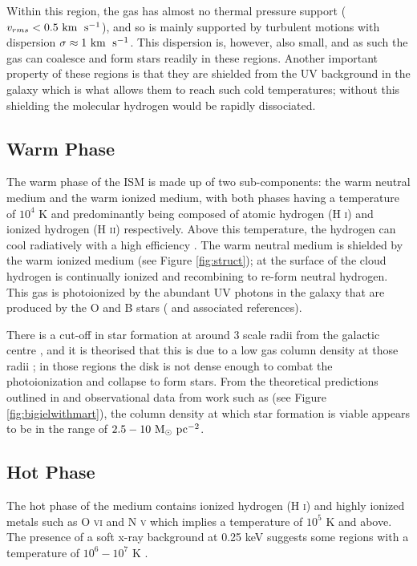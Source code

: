 Within this region, the gas has almost no thermal pressure support ($v_{rms} < 0.5 ~\mathrm{km}\;~\mathrm{s}^{-1}$), and so is mainly supported by turbulent motions \citep{larson_turbulence_1981, solomon_mass_1987, heyer_universality_2004} with dispersion $\sigma \approx 1 ~\mathrm{km}\;~\mathrm{s}^{-1}$.
This dispersion is, however, also small, and as such the gas can coalesce and form stars readily in these regions.
Another important property of these regions is that they are shielded from the UV background in the galaxy which is what allows them to reach such cold temperatures; without this shielding the molecular hydrogen would be rapidly dissociated. 

\subsection{Warm Phase}

The warm phase of the ISM is made up of two sub-components: the warm neutral medium and the warm ionized medium, with both phases having a temperature of $10^4$ K and predominantly being composed of atomic hydrogen (H \textsc{i}) and ionized hydrogen (H \textsc{ii}) respectively.
Above this temperature, the hydrogen can cool radiatively with a high efficiency \citep{gnat_time-dependent_2007}.
The warm neutral medium is shielded by the warm ionized medium (see Figure \ref{fig:struct}); at the surface of the cloud hydrogen is continually ionized and recombining to re-form neutral hydrogen.
This gas is photoionized by the abundant UV photons in the galaxy that are produced by the O and B stars (\citet{lefloch_photoionization_2002} and associated references).

There is a cut-off in star formation at around 3 scale radii from the galactic centre \citep{kennicutt_star_1989, martin_star_2001}, and it is theorised that this is due to a low gas column density at those radii \citep{schaye_star_2004}; in those regions the disk is not dense enough to combat the photoionization and collapse to form stars.
From the theoretical predictions outlined in \citet{schaye_star_2004} and observational data from work such as \citet{bigiel_star_2008} (see Figure \ref{fig:bigielwithmart}), the column density at which star formation is viable appears to be in the range of $2.5 - 10 ~\mathrm{M}_{\odot} ~\mathrm{pc}^{-2}$.

\subsection{Hot Phase}

The hot phase of the medium contains ionized hydrogen (H \textsc{i}) and highly ionized metals such as O \textsc{vi} and N \textsc{v} which implies a temperature of $10^{5}$ K and above. The presence of a soft x-ray background at 0.25 keV suggests some regions with a temperature of $10^6 - 10^7$ K \citep{ferriere_interstellar_2001}.

